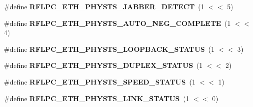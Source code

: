 \begin{DoxyCompactItemize}
\item 
\hypertarget{group__eth_gaac6251a6be69d693ea21404346ffa30a}{\#define {\bfseries R\-F\-L\-P\-C\-\_\-\-E\-T\-H\-\_\-\-P\-H\-Y\-S\-T\-S\-\_\-\-J\-A\-B\-B\-E\-R\-\_\-\-D\-E\-T\-E\-C\-T}~(1 $<$$<$ 5)}\label{group__eth_gaac6251a6be69d693ea21404346ffa30a}

\item 
\hypertarget{group__eth_ga72b9f3f194e4f6b968a43636be897bff}{\#define {\bfseries R\-F\-L\-P\-C\-\_\-\-E\-T\-H\-\_\-\-P\-H\-Y\-S\-T\-S\-\_\-\-A\-U\-T\-O\-\_\-\-N\-E\-G\-\_\-\-C\-O\-M\-P\-L\-E\-T\-E}~(1 $<$$<$ 4)}\label{group__eth_ga72b9f3f194e4f6b968a43636be897bff}

\item 
\hypertarget{group__eth_gac5d9e821faf7699176d1b52ac21d5046}{\#define {\bfseries R\-F\-L\-P\-C\-\_\-\-E\-T\-H\-\_\-\-P\-H\-Y\-S\-T\-S\-\_\-\-L\-O\-O\-P\-B\-A\-C\-K\-\_\-\-S\-T\-A\-T\-U\-S}~(1 $<$$<$ 3)}\label{group__eth_gac5d9e821faf7699176d1b52ac21d5046}

\item 
\hypertarget{group__eth_ga7fcc9aadf8f8998776c2c3244ab6be56}{\#define {\bfseries R\-F\-L\-P\-C\-\_\-\-E\-T\-H\-\_\-\-P\-H\-Y\-S\-T\-S\-\_\-\-D\-U\-P\-L\-E\-X\-\_\-\-S\-T\-A\-T\-U\-S}~(1 $<$$<$ 2)}\label{group__eth_ga7fcc9aadf8f8998776c2c3244ab6be56}

\item 
\hypertarget{group__eth_ga9a9cc71b5b5c6c2acb914d226bca2725}{\#define {\bfseries R\-F\-L\-P\-C\-\_\-\-E\-T\-H\-\_\-\-P\-H\-Y\-S\-T\-S\-\_\-\-S\-P\-E\-E\-D\-\_\-\-S\-T\-A\-T\-U\-S}~(1 $<$$<$ 1)}\label{group__eth_ga9a9cc71b5b5c6c2acb914d226bca2725}

\item 
\hypertarget{group__eth_ga9d77a34683583ee8c6b38ae6b27bce31}{\#define {\bfseries R\-F\-L\-P\-C\-\_\-\-E\-T\-H\-\_\-\-P\-H\-Y\-S\-T\-S\-\_\-\-L\-I\-N\-K\-\_\-\-S\-T\-A\-T\-U\-S}~(1 $<$$<$ 0)}\label{group__eth_ga9d77a34683583ee8c6b38ae6b27bce31}

\end{DoxyCompactItemize}
